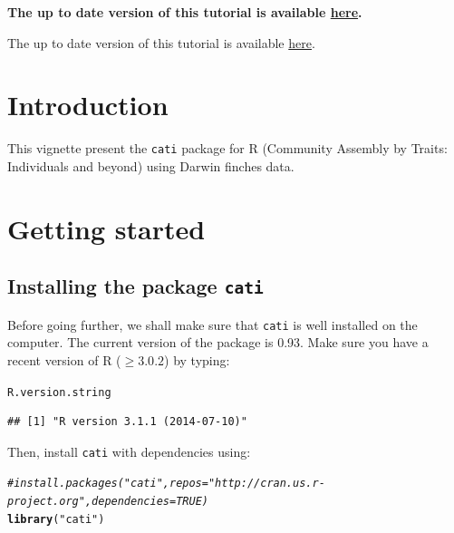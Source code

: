 \documentclass[12pt]{article}\usepackage[]{graphicx}\usepackage[]{color}
\makeatletter
\newcommand{\hlstr}[1]{\textcolor[rgb]{0.192,0.494,0.8}{#1}}%
\newcommand{\hlcom}[1]{\textcolor[rgb]{0.678,0.584,0.686}{\textit{#1}}}%
\newcommand{\hlstd}[1]{\textcolor[rgb]{0.345,0.345,0.345}{#1}}%
\newcommand{\hlkwd}[1]{\textcolor[rgb]{0.737,0.353,0.396}{\textbf{#1}}}%
\newenvironment{kframe}{%
 \def\at@end@of@kframe{}%
 \ifinner\ifhmode%
  \def\at@end@of@kframe{\end{minipage}}%
  \begin{minipage}{\columnwidth}%
 \fi\fi%
 \def\FrameCommand##1{\hskip\@totalleftmargin \hskip-\fboxsep
 \colorbox{shadecolor}{##1}\hskip-\fboxsep
     \hskip-\linewidth \hskip-\@totalleftmargin \hskip\columnwidth}%
 \MakeFramed {\advance\hsize-\width
   \@totalleftmargin\z@ \linewidth\hsize
   \@setminipage}}%
 {\par\unskip\endMakeFramed%
 \at@end@of@kframe}
\newenvironment{knitrout}{}{} %
\makeatother
\begin{document}
\vfill
\begin{center}
\textbf{The up to date version of this tutorial is available \href{http://sourceforge.net/p/cati-r/code/ci/master/tree/tutorial/vignettes/vignette.pdf}{here}.}
\end{center}

\hfill
The up to date version of this tutorial is available \href{http://sourceforge.net/p/cati-r/code/ci/master/tree/tutorial/vignettes/vignette.pdf}{here}.


\newpage
\tableofcontents

\newpage


\section{Introduction}
This vignette present the \texttt{cati} package for R (Community Assembly by Traits: Individuals and beyond) using Darwin finches data.

\section{Getting started}
\subsection{Installing the package \texttt{cati}}

Before going further, we shall make sure that \texttt{cati} is well installed
on the computer.
The current version of the package is 0.93.
Make sure you have a recent version of R ($\geq 3.0.2$) by typing:

\begin{knitrout}
\color{fgcolor}\begin{kframe}
\begin{alltt}
\hlstd{R.version.string}
\end{alltt}
\begin{verbatim}
## [1] "R version 3.1.1 (2014-07-10)"
\end{verbatim}
\end{kframe}
\end{knitrout}

Then, install \texttt{cati} with dependencies using:
\begin{knitrout}
\color{fgcolor}\begin{kframe}
\begin{alltt}
\hlcom{#install.packages("cati", repos = "http://cran.us.r-project.org", dependencies = TRUE)}
\hlkwd{library}\hlstd{(}\hlstr{"cati"}\hlstd{)}
\end{alltt}


{\ttfamily\noindent\itshape\color{messagecolor}{\#\# Loading required package: nlme\\\#\# Loading required package: ade4\\\#\# Loading required package: ape}}\end{kframe}
\end{knitrout}
\end{document}
